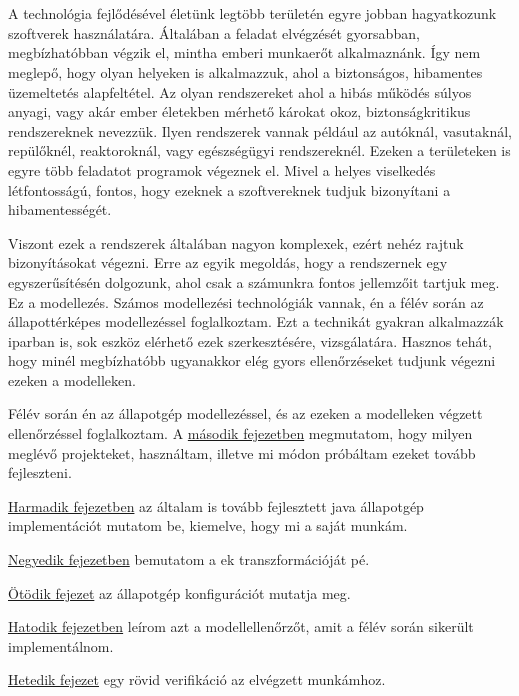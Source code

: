 \chapter{\bevezetes}
\label{sec:intro}

A technológia fejlődésével életünk legtöbb területén egyre jobban hagyatkozunk szoftverek használatára. Általában a feladat elvégzését gyorsabban, megbízhatóbban végzik el, mintha emberi munkaerőt alkalmaznánk. Így nem meglepő, hogy olyan helyeken is alkalmazzuk, ahol a biztonságos, hibamentes üzemeltetés alapfeltétel. Az olyan rendszereket ahol a hibás működés súlyos anyagi, vagy akár ember életekben mérhető károkat okoz, biztonságkritikus rendszereknek nevezzük. Ilyen rendszerek vannak például az autóknál, vasutaknál, repülőknél, reaktoroknál, vagy egészségügyi rendszereknél. Ezeken a területeken is egyre több feladatot programok végeznek el. Mivel a helyes viselkedés létfontosságú, fontos, hogy ezeknek a szoftvereknek tudjuk bizonyítani a hibamentességét.

Viszont ezek a rendszerek általában nagyon komplexek, ezért nehéz rajtuk bizonyításokat végezni. Erre az egyik megoldás, hogy a rendszernek egy egyszerűsítésén dolgozunk, ahol csak a számunkra fontos jellemzőit tartjuk meg. Ez a modellezés. Számos modellezési technológiák vannak, én a félév során az állapottérképes modellezéssel foglalkoztam. Ezt a technikát gyakran alkalmazzák iparban is, sok eszköz elérhető ezek szerkesztésére, vizsgálatára. Hasznos tehát, hogy minél megbízhatóbb ugyanakkor elég gyors ellenőrzéseket tudjunk végezni ezeken a modelleken.

Félév során én az állapotgép modellezéssel, és az ezeken a modelleken végzett ellenőrzéssel foglalkoztam. A \hyperref[sec:archiutecture]{második fejezetben} megmutatom, hogy milyen meglévő projekteket, használtam, illetve mi módon próbáltam ezeket tovább fejleszteni.

\hyperref[sec:thetaleiras]{Harmadik fejezetben} az általam is tovább fejlesztett java állapotgép implementációt mutatom be, kiemelve, hogy mi a saját munkám.

\hyperref[sec:transzformacio]{Negyedik fejezetben} bemutatom a {\gammaSc}ek transzformációját {\thetaSc}pé.

\hyperref[sec:stateconfig]{Ötödik fejezet} az állapotgép konfigurációt mutatja meg. 

\hyperref[sec:bmc]{Hatodik fejezetben} leírom azt a modellellenőrzőt, amit a félév során sikerült implementálnom. 

\hyperref[sec:verifikacio]{Hetedik fejezet} egy rövid verifikáció az elvégzett munkámhoz. 
